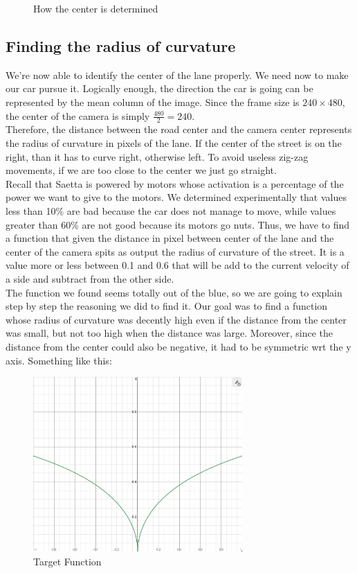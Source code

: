 \documentclass[12pt,a4paper]{article}
\begin{document}
\begin{large}
\begin{figure} [!htb]
  \centering
  \captionsetup{justification=centering}
  \caption{How the center is determined}
  \end{figure}

\subsection{Finding the radius of curvature}
We're now able to identify the center of the lane properly. We need now to make our car pursue it. Logically enough, the direction the car is going can be represented by the mean column of the image. Since the frame size is $240 \times 480$, the center of the camera is simply $\frac{480}{2}=240$.\\
Therefore, the distance between the road center and the camera center represents the radius of curvature in pixels of the lane. If the center of the street is on the right, than it has to curve right, otherwise left. To avoid useless zig-zag movements, if we are too close to the center we just go straight. \\
Recall that Saetta is powered by motors whose activation is a percentage of the power we want to give to the motors. We determined experimentally that values less than 10\% are bad because the car does not manage to move, while values greater than 60\% are not good because its motors go nuts. 
Thus, we have to find a function that given the distance in pixel between center of the lane and the center of the camera spits as output the radius of curvature of the street. It is a value more or less between 0.1 and 0.6 that will be add to the current velocity of a side and subtract from the other side. \\
The function we found seems totally out of the blue, so we are going to explain step by step the reasoning we did to find it.
Our goal was to find a function whose radius of curvature was decently high even if the distance from the center was small, but not too high when the distance was large. Moreover, since the distance from the center could also be negative, it had to be symmetric wrt the y axis. Something like this:

\begin{figure} [!h]
  \centering
  \captionsetup{justification=centering}
  \includegraphics[width=8cm]{images/madFunction.png}
  \caption{Target Function}
  \end{figure}


\end{large}
\end{document}
